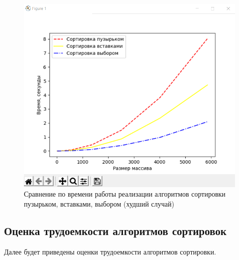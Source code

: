 \documentclass[a4paper,12pt]{article}
\begin{document}
	\begin{figure}[H]
		\centering
		\includegraphics[scale=0.6]{test3.png}
		\captionsetup{justification=centering}
		\caption{Сравнение по времени работы реализации алгоритмов сортировки пузырьком, вставками, выбором (худший случай)}
		\label{Рис 10}
	\end{figure}
	
	
	\subsection{Оценка трудоемкости алгоритмов сортировок}
	\hfill
	
	Далее будет приведены оценки трудоемкости алгоритмов сортировки.
\end{document}

